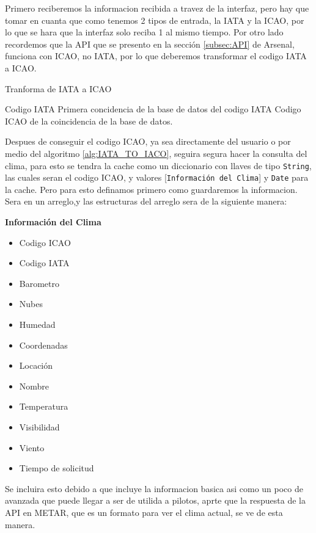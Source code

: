 Primero reciberemos la informacion recibida a travez de la interfaz, pero hay que tomar en cuanta que como tenemos 2 tipos de entrada, 
la IATA y la ICAO, por lo que se hara que la interfaz solo reciba 1 al mismo tiempo. Por otro lado recordemos que la API que se presento
en la sección \ref{subsec:API} de Arsenal, funciona con ICAO, no IATA, por lo que deberemos transformar el codigo IATA a ICAO.

\begin{algorithm}
    \caption{Tranforma de IATA a ICAO}\label{alg:IATA_TO_IACO}
    \begin{algorithmic}
        \Require Codigo IATA
        \State Primera concidencia de la base de datos del codigo IATA
        \Return Codigo ICAO de la coincidencia de la base de datos.
    \end{algorithmic}
\end{algorithm}

Despues de conseguir el codigo ICAO, ya sea directamente del usuario o por medio del algoritmo \ref{alg:IATA_TO_IACO},
seguira segura hacer la consulta del clima, para esto se tendra la cache como un diccionario con llaves de tipo \texttt{String},
las cuales seran el codigo ICAO, y valores  [\texttt{Información del Clima}] y \texttt{Date} para la cache. Pero para esto definamos primero como guardaremos la informacion. 
Sera en un arreglo,y las estructuras del arreglo sera de la siguiente manera:

\textbf{Información del Clima}
\begin{itemize}
    \label{strc:info}
    \item Codigo ICAO
    \item Codigo IATA
    \item Barometro
    \item Nubes
    \item Humedad
    \item Coordenadas
    \item Locación
    \item Nombre
    \item Temperatura
    \item Visibilidad
    \item Viento
    \item Tiempo de solicitud
\end{itemize}

Se incluira esto debido a que incluye la informacion basica asi como un poco de avanzada que puede llegar a ser de utilida a pilotos, aprte
que la respuesta de la API en METAR, que es un formato para ver el clima actual, se ve de esta manera.

